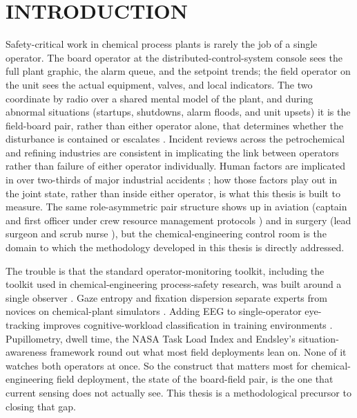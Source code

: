 \chapter{INTRODUCTION}
Safety-critical work in chemical process plants is rarely the job of a single operator. The board operator at the distributed-control-system console sees the full plant graphic, the alarm queue, and the setpoint trends; the field operator on the unit sees the actual equipment, valves, and local indicators. The two coordinate by radio over a shared mental model of the plant, and during abnormal situations (startups, shutdowns, alarm floods, and unit upsets) it is the field-board pair, rather than either operator alone, that determines whether the disturbance is contained or escalates \cite{bullemer1996abnormal,nimmo1998abnormal,nazir2012role}. Incident reviews across the petrochemical and refining industries are consistent in implicating the link between operators rather than failure of either operator individually. Human factors are implicated in over two-thirds of major industrial accidents \cite{reason1990human,kletz2001learned}; how those factors play out in the joint state, rather than inside either operator, is what this thesis is built to measure. The same role-asymmetric pair structure shows up in aviation (captain and first officer under crew resource management protocols \cite{helmreich1999evolution,kanki2010crew}) and in surgery (lead surgeon and scrub nurse \cite{undre2007teamwork,catchpole2008teamwork}), but the chemical-engineering control room is the domain to which the methodology developed in this thesis is directly addressed.

The trouble is that the standard operator-monitoring toolkit, including the toolkit used in chemical-engineering process-safety research, was built around a single observer \cite{wickens2008model,parasuraman2008situation}. Gaze entropy and fixation dispersion separate experts from novices on chemical-plant simulators \cite{bhavsar2017eye,sharma2016eye,shahab2021metrics}. Adding EEG to single-operator eye-tracking improves cognitive-workload classification in training environments \cite{iqbal2024multi,iqbal2020dynamic}. Pupillometry, dwell time, the NASA Task Load Index \cite{hart1988development} and Endsley's situation-awareness framework \cite{endsley1995toward} round out what most field deployments lean on. None of it watches both operators at once. So the construct that matters most for chemical-engineering field deployment, the state of the board-field pair, is the one that current sensing does not actually see. This thesis is a methodological precursor to closing that gap.

